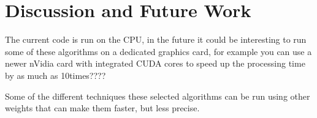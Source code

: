 \section{Discussion and Future Work}
The current code is run on the CPU, in the future it could be interesting to run some of these algorithms on a dedicated graphics card, for example you can use a newer nVidia card with integrated CUDA cores to speed up the processing time by as much as 10times????

Some of the different techniques these selected algorithms can be run using other weights that can make them faster, but less precise.
